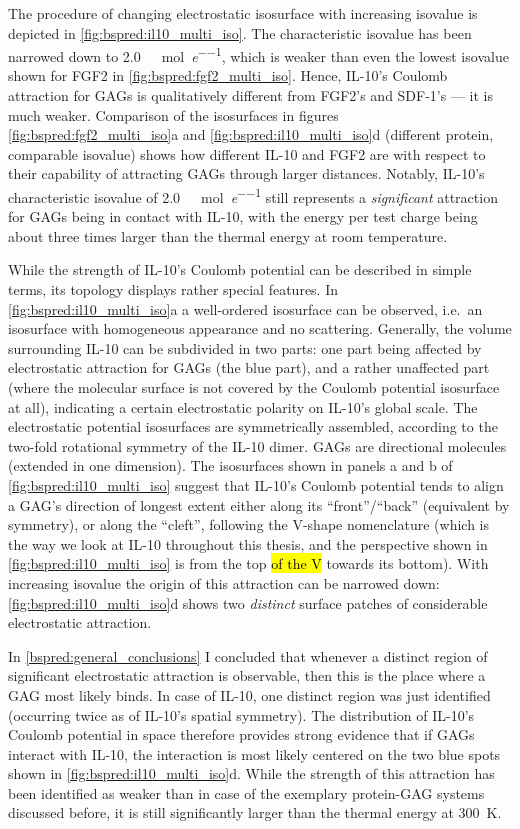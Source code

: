 The procedure of changing electrostatic isosurface with increasing isovalue is
depicted in \cref{fig:bspred:il10_multi_iso}. The characteristic isovalue has
been narrowed down to \SI{2.0}{\kilo\calory\per\mole\per\elementarycharge},
which is weaker than even the lowest isovalue shown for FGF2 in
\cref{fig:bspred:fgf2_multi_iso}. Hence, IL-10's Coulomb attraction for GAGs
is qualitatively different from FGF2's and SDF-1's --- it is much weaker.
Comparison of the isosurfaces in figures \ref{fig:bspred:fgf2_multi_iso}a and
\ref{fig:bspred:il10_multi_iso}d (different protein, comparable isovalue) shows
how different IL-10 and FGF2 are with respect to their capability of attracting
GAGs through larger distances. Notably, IL-10's characteristic isovalue of
\SI{2.0}{\kilo\calory\per\mole\per\elementarycharge} still represents a
\textit{significant} attraction for GAGs being in contact with IL-10, with the
energy per test charge being about three times larger than the thermal energy at
room temperature.

While the strength of IL-10's Coulomb potential can be described in simple
terms, its topology displays rather special features. In
\cref{fig:bspred:il10_multi_iso}a a well-ordered isosurface can be observed,
i.e.\ an isosurface with homogeneous appearance and no scattering. Generally,
the volume surrounding IL-10 can be subdivided in two parts: one part being
affected by electrostatic attraction for GAGs (the blue part), and a rather
unaffected part (where the molecular surface is not covered by the Coulomb
potential isosurface at all), indicating a certain electrostatic polarity on
IL-10's global scale. The electrostatic potential isosurfaces are symmetrically
assembled, according to the two-fold rotational symmetry of the IL-10 dimer.
GAGs are directional molecules (extended in one dimension). The isosurfaces
shown in panels a and b of \cref{fig:bspred:il10_multi_iso} suggest that IL-10's
Coulomb potential tends to align a GAG's direction of longest extent either
along its \enquote{front}/\enquote{back} (equivalent by symmetry), or along the
\enquote{cleft}, following the V-shape nomenclature (which is the way we look at
IL-10 throughout this thesis, and the perspective shown in
\cref{fig:bspred:il10_multi_iso} is from the top \hl{of the V} towards its
bottom). With increasing isovalue the origin of this attraction can be narrowed
down: \cref{fig:bspred:il10_multi_iso}d shows two \textit{distinct} surface
patches of considerable electrostatic attraction.

In \cref{bspred:general_conclusions} I concluded that whenever a distinct region
of significant electrostatic attraction is observable, then this is the place
where a GAG most likely binds. In case of IL-10, one distinct region was just
identified (occurring twice as of IL-10's spatial symmetry). The distribution of
IL-10's Coulomb potential in space therefore provides strong evidence that if
GAGs interact with IL-10, the interaction is most likely centered on the two
blue spots shown in \cref{fig:bspred:il10_multi_iso}d. While the strength of
this attraction has been identified as weaker than in case of the exemplary
protein-GAG systems discussed before, it is still significantly larger than the
thermal energy at \SI{300}{\kelvin}.


